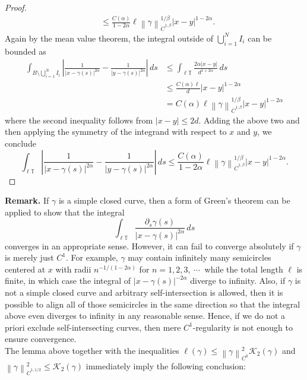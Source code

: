 \documentclass[reqno,centertags,12pt]{amsart}
\theoremstyle{definition}
\numberwithin{equation}{section}
\newcommand{\abs}[1]{\left\lvert#1\right\rvert}
\newcommand{\norm}[1]{\left\|#1\right\|}
\newcommand{\bbT}{{\mathbb{T}}}
\begin{document}
\begin{proof}
\begin{align*}
        &\leq \frac{C(\alpha)}{1-2\alpha}
        \ell\norm{\gamma}_{\dot{C}^{1,\beta}}^{1/\beta}
        \abs{x - y}^{1-2\alpha}.
    \end{align*}
    Again by the mean value theorem, the integral outside of $\bigcup_{i=1}^{N}I_{i}$
    can be bounded as
    \begin{align*}
        \int_{B\setminus \bigcup_{i=1}^{N}I_{i}}
        \abs{
            \frac{1}{\abs{x - \gamma(s)}^{2\alpha}}
            - \frac{1}{\abs{y - \gamma(s)}^{2\alpha}}
        }\,ds
        &\leq \int_{\ell\bbT}\frac{2\alpha\abs{x-y}}{d^{1+2\alpha}}\,ds \\
        &\leq \frac{C(\alpha)\ell}{d}\abs{x-y}^{1-2\alpha} \\
        &= C(\alpha)\ell\norm{\gamma}_{\dot{C}^{1,\beta}}^{1/\beta}
        \abs{x - y}^{1-2\alpha}
    \end{align*}
    where the second inequality follows from $\abs{x-y}\leq 2d$. Adding the above two
    and then applying the symmetry of the integrand with respect to $x$ and $y$, we conclude
    \[
        \int_{\ell\bbT}
        \abs{
            \frac{1}{\abs{x - \gamma(s)}^{2\alpha}}
            - \frac{1}{\abs{y - \gamma(s)}^{2\alpha}}
        }\,ds
        \leq \frac{C(\alpha)}{1-2\alpha}
        \ell\norm{\gamma}_{\dot{C}^{1,\beta}}^{1/\beta}\abs{x - y}^{1-2\alpha}.
    \]
\end{proof}

\textbf{Remark.} If $\gamma$ is a simple closed curve, then a form of Green's theorem
can be applied to show that the integral
\[
    \int_{\ell\bbT}\frac{\partial_{s}\gamma(s)}{\abs{x - \gamma(s)}^{2\alpha}}\,ds
\]
converges in an appropriate sense. However, it can fail to converge absolutely
if $\gamma$ is merely just $C^{1}$. For example, $\gamma$ may contain infinitely many
semicircles centered at $x$ with radii $n^{-1/(1-2\alpha)}$ for $n=1,2,3,\ \cdots\ $
while the total length $\ell$ is finite, in which case the integral of
$\abs{x-\gamma(s)}^{-2\alpha}$ diverge to infinity. Also, if $\gamma$ is not
a simple closed curve and arbitrary self-intersection is allowed, then it is possible
to align all of those semicircles in the same direction so that 
the integral above even diverges to infinity in any reasonable sense.
Hence, if we do not a priori exclude self-intersecting curves,
then mere $C^{1}$-regularity is not enough to ensure convergence.\\


The lemma above together with the inequalities
$\ell(\gamma) \leq \norm{\gamma}_{C^{0}}^{2}\mathcal{K}_{2}(\gamma)$
and $\norm{\gamma}_{\dot{C}^{1,1/2}}^{2} \leq \mathcal{K}_{2}(\gamma)$
immediately imply the following conclusion:
\end{document}
